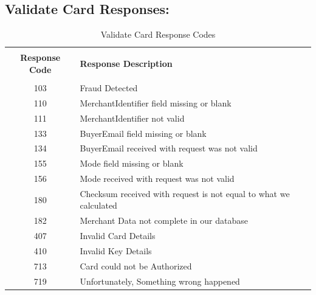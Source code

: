 \documentclass{article}
\begin{document}
\subsection{Validate Card Responses:}
\begin{longtable}{||c|p{12.5cm}||}
   \rowcolor{white}
   \caption{Validate Card Response Codes}\\
   \rowcolor{green!50}
\bfseries{Response Code} & \bfseries{Response Description} \\ \hline  & \\
103 &  Fraud Detected  \\
110 &  MerchantIdentifier field missing or blank  \\
111 &  MerchantIdentifier not valid  \\
133 &  BuyerEmail field missing or blank  \\
134 &  BuyerEmail received with request was not valid  \\
155 &  Mode field missing or blank  \\
156 &  Mode received with request was not valid  \\
180 &  Checksum received with request is not equal to what we calculated  \\
182 &  Merchant Data not complete in our database  \\
407 &  Invalid Card Details  \\
410 &  Invalid Key Details  \\
713 &  Card could not be Authorized  \\
719 &  Unfortunately, Something wrong happened \\
\end{longtable}
\newpage
\end{document}
